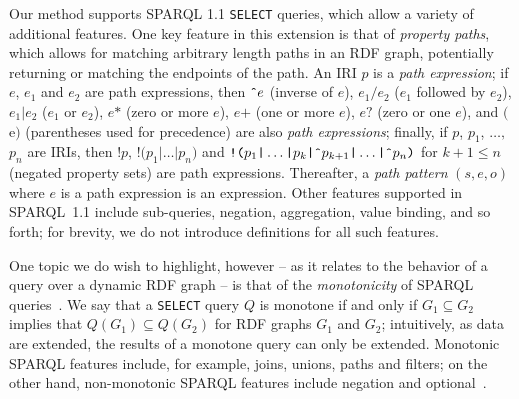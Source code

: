 \documentclass[runningheads]{llncs}
\begin{document}
Our method supports SPARQL 1.1 \texttt{SELECT} queries, which allow a variety of additional features. One key feature in this extension is that of \textit{property paths}, which allows for matching arbitrary length paths in an RDF graph, potentially returning or matching the endpoints of the path. An IRI $p$ is a \emph{path expression}; if $e$, $e_1$ and $e_2$ are path expressions, then $\texttt{\^{}}e$ (inverse of $e$), $e_1 \texttt{/} e_2$ ($e_1$ followed by $e_2$), $e_1 \texttt{|} e_2$ ($e_1$ or $e_2$), $e\texttt{*}$ (zero or more $e$), $e\texttt{+}$ (one or more $e$), $e\texttt{?}$ (zero or one $e$), and $\texttt{(}$e$\texttt{)}$ (parentheses used for precedence) are also \textit{path expressions}; finally, if $p$, $p_1$, $\ldots,$ $p_n$ are IRIs, then $\texttt{!}p$, $\texttt{!}\texttt{(}p_1 \texttt{|} \ldots \texttt{|} p_n\texttt{)}$ and $\texttt{!}\texttt{(}p_1 \texttt{|} \ldots \texttt{|} p_k \texttt{|}  \texttt{{\^{}}}p_{k+1} \texttt{|} \ldots \texttt{|} \texttt{{\^{}}}p_n\texttt{)}$ for $k+1 \leq n$ (negated property sets) are path expressions. Thereafter, a \textit{path pattern} $(s,e,o)$ where $e$ is a path expression is an expression. Other features supported in SPARQL~1.1 include sub-queries, negation, aggregation, value binding, and so forth; for brevity, we do not introduce definitions for all such features.

One topic we do wish to highlight, however -- as it relates to the behavior of a query over a dynamic RDF graph -- is that of the \emph{monotonicity} of SPARQL queries~\cite{ArenasP11,ArenasU17}. We say that a \texttt{SELECT} query $Q$ is monotone if and only if $G_1 \subseteq G_2$ implies that $Q(G_1) \subseteq Q(G_2)$ for RDF graphs $G_1$ and $G_2$; intuitively, as data are extended, the results of a monotone query can only be extended. Monotonic SPARQL features include, for example, joins, unions, paths and filters; on the other hand, non-monotonic SPARQL features include negation and optional~\cite{ArenasP11}.
\end{document}
